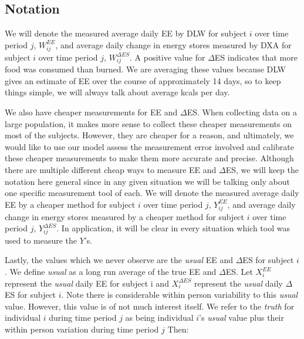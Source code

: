 \documentclass[11pt]{article}\usepackage[]{graphicx}\usepackage[]{color}
\begin{document}
\subsection{Notation}

We will denote the measured average daily EE by DLW for subject $i$ over time period $j$, $W_{ij}^{EE}$, and average daily change in energy stores measured by DXA for subject $i$ over time period $j$, $W_{ij}^{\Delta ES}$. A positive value for $\Delta$ES indicates that more food was consumed than burned. We are averaging these values because DLW gives an estimate of EE over the course of approximately 14 days, so to keep things simple, we will always talk about average kcals per day. 

We also have cheaper measurements for EE and $\Delta$ES. When collecting data on a large population, it makes more sense to collect these cheaper measurements on most of the subjects. However, they are cheaper for a reason, and ultimately, we would like to use our model assess the measurement error involved and calibrate these cheaper measurements to make them more accurate and precise. Although there are multiple different cheap ways to measure EE and $\Delta$ES, we will keep the notation here general since in any given situation we will be talking only about one specific measurement tool of each. We will denote the measured average daily EE by a cheaper method for subject $i$ over time period $j$, $Y_{ij}^{EE}$, and average daily change in energy stores measured by a cheaper method for subject $i$ over time period $j$, $Y_{ij}^{\Delta ES}$. In application, it will be clear in every situation which tool was used to measure the $Y$'s.

Lastly, the values which we never observe are the \emph{usual} EE and $\Delta$ES for subject $i$. We define \emph{usual} as a long run average of the true EE and $\Delta$ES. Let $X_i^{EE}$ represent the \emph{usual} daily EE for subject i and $X_i^{\Delta ES}$ represent the \emph{usual} daily $\Delta$ES for subject $i$. Note there is considerable within person variability to this \emph{usual} value. However, this value is of not much interest itself. We refer to the \emph{truth} for individual $i$ during time period $j$ as being individual $i$'s \emph{usual} value plus their within person variation during time period $j$ Then:

\end{document}

